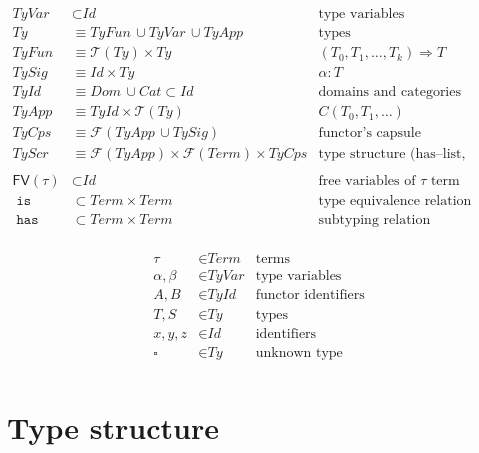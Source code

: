\documentclass[10pt]{article}
\newcommand\Fin{\mathcal{F}}
\newcommand\Tup{\mathcal{T}}
\newcommand\FV{\mathsf{FV}}
\newcommand\Dom{\textit{Dom}}
\newcommand\Cat{\textit{Cat}}
\newcommand\Term{\textit{Term}}
\newcommand\Id{\textit{Id}}
\newcommand\Ty{\textit{Ty}}
\newcommand\TyId{\textit{TyId}}
\newcommand\TyApp{\textit{TyApp}}
\newcommand\TyFun{\textit{TyFun}}
\newcommand\TySig{\textit{TySig}}
\newcommand\TyVar{\textit{TyVar}}
\newcommand\TyCps{\textit{TyCps}}
\newcommand\TyScr{\textit{TyScr}}
\newcommand\TyHas{\;\texttt{has}\;}
\newcommand\TyIs{\;\texttt{is}\;}
\begin{document}
\begin{table}[!h]
  \begin{align*}
    \TyVar & \subset \Id
      & \text{type variables} \\
    \Ty & \equiv \TyFun \,\cup \TyVar \,\cup \TyApp
      & \text{types} \\
    \TyFun & \equiv \Tup(\Ty) \times \Ty
      & (T_0, T_1, \ldots, T_k) \Rightarrow T \\
    \TySig & \equiv \Id \times \Ty
      & \alpha : T \\
    \TyId & \equiv \Dom \,\cup \Cat \subset \Id
      & \text{domains and categories identifiers} \\
    \TyApp & \equiv \TyId \times \Tup(\Ty)
      & C(T_{0}, T_{1}, \ldots) \\
    \TyCps & \equiv \Fin(\TyApp\,\cup \TySig)
      & \text{functor's capsule} \\
    \TyScr & \equiv \Fin(\TyApp) \times \Fin(\Term) \times \TyCps
      & \text{type structure (has--list, constraints, capsule)} \\
    \\
    \FV(\tau) & \subset \Id
      & \text{free variables of $\tau$ term} \\
    \TyIs & \subset \Term \times \Term & \text{type equivalence relation} \\
    \TyHas & \subset \Term \times \Term & \text{subtyping relation} \\
  \end{align*}

  \begin{align*}
    \tau & \in \Term & \text{terms} \\
    \alpha, \beta & \in \TyVar & \text{type variables} \\
    A, B & \in \TyId & \text{functor identifiers} \\
    T, S & \in \Ty & \text{types} \\
    x, y, z & \in \Id & \text{identifiers} \\
    \square & \in \Ty & \text{unknown type} \\
  \end{align*}
\end{table}

\clearpage
\section*{Type structure}
\end{document}
